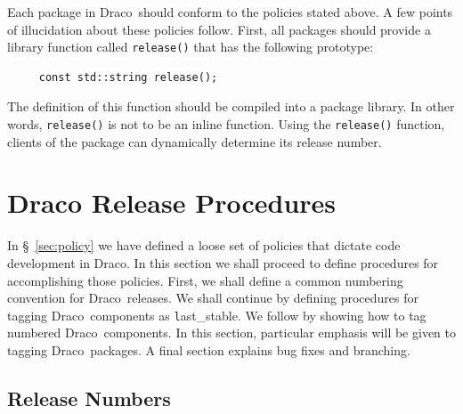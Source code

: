 \documentclass[11pt]{nmemo}
\newcommand{\draco}{{\normalfont\normalsize\textsf Draco}}
\newcommand{\stable}{{\normalfont\normalsize\texttt last\_stable}}
\begin{document}
Each package in \draco\ should conform to the policies stated above.
A few points of illucidation about these policies follow.  First, all 
packages should provide a library function called \texttt{release()}
that has the following prototype:
\begin{verbatim}
     const std::string release();
\end{verbatim}
The definition of this function should be compiled into a package
library.  In other words, \texttt{release()} is not to be an inline
function.  Using the \texttt{release()} function, clients of the
package can dynamically determine its release number.


\section{Draco Release Procedures}
\label{sec:procedures}

In \S~\ref{sec:policy} we have defined a loose set of policies that
dictate code development in \draco.  In this section we shall proceed
to define procedures for accomplishing those policies.  First, we
shall define a common numbering convention for \draco\ releases.  We
shall continue by defining procedures for tagging \draco\ components
as \stable.  We follow by showing how to tag numbered \draco\ 
components.  In this section, particular emphasis will be given to
tagging \draco\ packages.  A final section explains bug fixes and
branching.

\subsection{Release Numbers}
\label{sec:rel_num}
\end{document}
